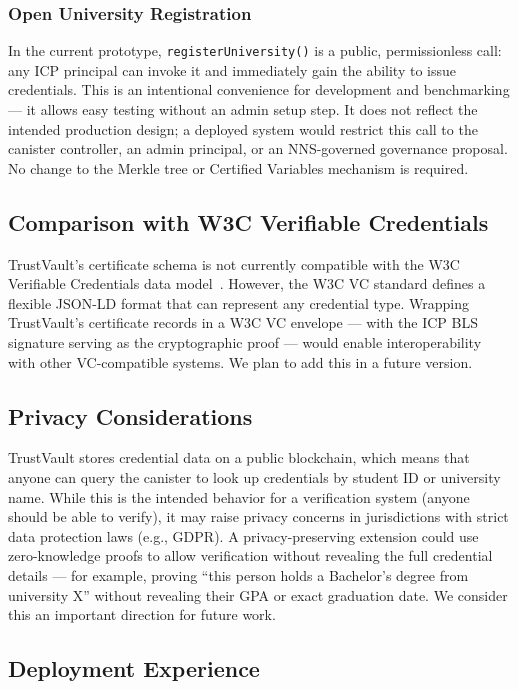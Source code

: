\documentclass[journal]{IEEEtran}
\begin{document}
\subsubsection{Open University Registration}
In the current prototype, \texttt{registerUniversity()} is a public, permissionless call: any ICP principal can invoke it and immediately gain the ability to issue credentials. This is an intentional convenience for development and benchmarking — it allows easy testing without an admin setup step. It does not reflect the intended production design; a deployed system would restrict this call to the canister controller, an admin principal, or an NNS-governed governance proposal. No change to the Merkle tree or Certified Variables mechanism is required.

\subsection{Comparison with W3C Verifiable Credentials}

TrustVault's certificate schema is not currently compatible with the W3C Verifiable Credentials data model~\cite{w3c2022vc}. However, the W3C VC standard defines a flexible JSON-LD format that can represent any credential type. Wrapping TrustVault's certificate records in a W3C VC envelope — with the ICP BLS signature serving as the cryptographic proof — would enable interoperability with other VC-compatible systems. We plan to add this in a future version.

\subsection{Privacy Considerations}

TrustVault stores credential data on a public blockchain, which means that anyone can query the canister to look up credentials by student ID or university name. While this is the intended behavior for a verification system (anyone should be able to verify), it may raise privacy concerns in jurisdictions with strict data protection laws (e.g., GDPR). A privacy-preserving extension could use zero-knowledge proofs to allow verification without revealing the full credential details — for example, proving ``this person holds a Bachelor's degree from university X'' without revealing their GPA or exact graduation date. We consider this an important direction for future work.

\subsection{Deployment Experience}
\end{document}
